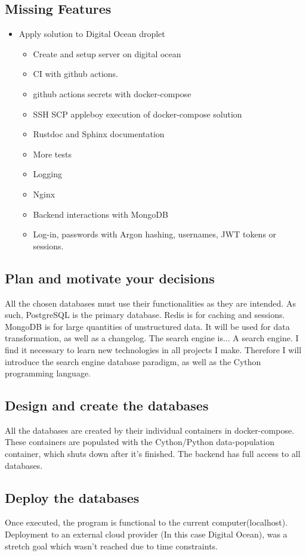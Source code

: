 \documentclass[a4paper, 12pt]{article}
\begin{document}
\subsection{Missing Features}
\begin{itemize}
	\item Apply solution to Digital Ocean droplet
	\begin{itemize}
		\item Create and setup server on digital ocean
		\item CI with github actions.
		\item github actions secrets with docker-compose
		\item SSH SCP appleboy execution of docker-compose solution
		\item Rustdoc and Sphinx documentation
		\item More tests
		\item Logging 
		\item Nginx
		\item Backend interactions with MongoDB
		\item Log-in, passwords with Argon hashing, usernames, JWT tokens or sessions.
	\end{itemize}
\end{itemize}

\subsection{Plan and motivate your decisions}
All the chosen databases must use their functionalities as they are intended. As such, PostgreSQL is the primary database. Redis is for caching and sessions. MongoDB is for large quantities of unstructured data. It will be used for data transformation, as well as a changelog. The search engine is... A search engine. I find it necessary to learn new technologies in all projects I make. Therefore I will introduce the search engine database paradigm, as well as the Cython programming language. 

\subsection{Design and create the databases}
All the databases are created by their individual containers in docker-compose. These containers are populated with the Cython/Python data-population container, which shuts down after it's finished. The backend has full access to all databases.

\subsection{Deploy the databases}
Once executed, the program is functional to the current computer(localhost). Deployment to an external cloud provider (In this case Digital Ocean), was a stretch goal which wasn't reached due to time constraints.
\end{document}
